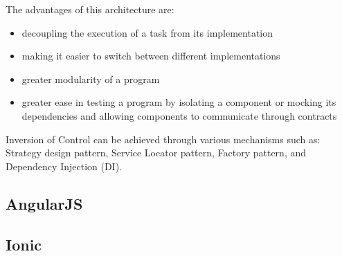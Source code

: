 The advantages of this architecture are:
\begin{itemize}
\item decoupling the execution of a task from its implementation
\item making it easier to switch between different implementations
\item greater modularity of a program
\item greater ease in testing a program by isolating a component or mocking its dependencies and allowing components to communicate through contracts
\end{itemize}

Inversion of Control can be achieved through various mechanisms such as: Strategy design pattern, Service Locator pattern, Factory pattern, and Dependency Injection (DI).




\subsection{AngularJS}

\subsection{Ionic}